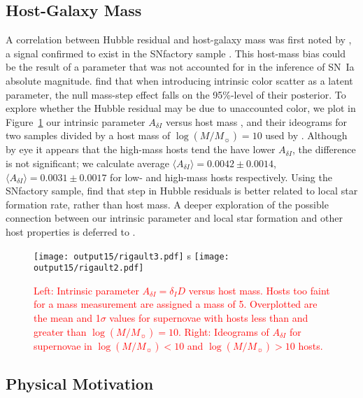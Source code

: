 \documentclass{aastex61}   	%
\begin{document}
\subsection{Host-Galaxy Mass}
\color{red}
A correlation between Hubble residual and host-galaxy mass
was first noted by \citet{2010ApJ...715..743K,2010MNRAS.406..782S}, a signal confirmed to exist in the SNfactory
sample \citep{2013ApJ...770..108C}.
This host-mass bias could be the result of a parameter that was not accounted for in the inference of SN~Ia absolute magnitude.
\citet{2016arXiv160904470M} find that when introducing intrinsic color scatter as a latent parameter, the null mass-step effect falls on the 95\%-level of their posterior.
To explore whether the Hubble residual may be due to unaccounted color,
we plot in Figure~\ref{childress:fig} our intrinsic parameter  $A_{\delta I}$  versus host mass 
\citep{2016rigault}, and their ideograms for two samples divided by a host mass of  $\log{(M/M_\sun)}=10$
used by  \citet{2013ApJ...770..108C}.
Although by eye it appears that the high-mass hosts tend the have lower $A_{\delta I}$, the difference is
not significant; we calculate  average $\langle A_{\delta I} \rangle=   0.0042 \pm    0.0014$,
$\langle A_{\delta I} \rangle=   0.0031 \pm    0.0017 $ for low- and high-mass hosts respectively. 
Using the SNfactory sample,
\citet{2013A&A...560A..66R} find that step in Hubble residuals is better related to local star formation rate, rather than host mass.
A deeper exploration of the possible connection between our intrinsic parameter and local star formation and other host properties is deferred to
\citet{2016rigault}.
\color{black}
\begin{figure}[htbp] %
   \centering
   \texttt{[image: output15/rigault3.pdf]}
s     \texttt{[image: output15/rigault2.pdf]}
      \caption{\textcolor{red}{Left: Intrinsic parameter $A_{\delta I}=\delta_I D$  versus host mass.  Hosts too faint for a mass measurement
      are assigned a mass of 5.  Overplotted are the mean and 1$\sigma$ values for supernovae with hosts
      less than and greater than  $\log{(M/M_\sun)}=10$.
Right: Ideograms of  $A_{\delta I}$ for supernovae in $\log{(M/M_\sun)}<10$ and $\log{(M/M_\sun)}>10$ hosts. 
}
   \label{childress:fig}}
\end{figure}


\subsection{Physical Motivation}
\end{document}

